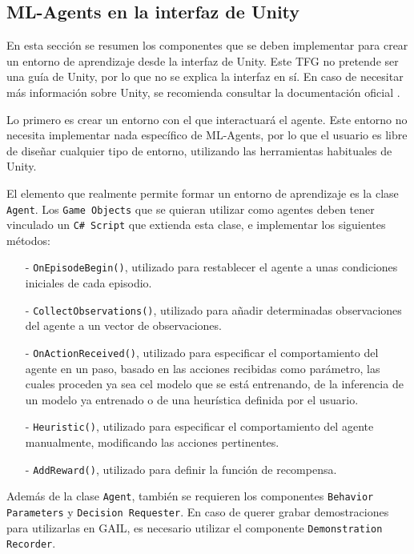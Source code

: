 \newpage

\subsection{ML-Agents en la interfaz de Unity}

En esta sección se resumen los componentes que se deben implementar para crear un entorno de aprendizaje desde la interfaz de Unity. Este TFG no pretende ser una guía de Unity, por lo que no se explica la interfaz en sí. En caso de necesitar más información sobre Unity, se recomienda consultar la documentación oficial \cite{unity-docs}.

Lo primero es crear un entorno con el que interactuará el agente. Este entorno no necesita implementar nada específico de ML-Agents, por lo que el usuario es libre de diseñar cualquier tipo de entorno, utilizando las herramientas habituales de Unity.

El elemento que realmente permite formar un entorno de aprendizaje es la clase \texttt{Agent}. Los \texttt{Game Objects} que se quieran utilizar como agentes deben tener vinculado un \texttt{C\# Script} que extienda esta clase, e implementar los siguientes métodos:
\begin{enumerate}
    \item[-] \texttt{OnEpisodeBegin()}, utilizado para restablecer el agente a unas condiciones iniciales de cada episodio.
    \item[-] \texttt{CollectObservations()}, utilizado para añadir determinadas observaciones del agente a un vector de observaciones.
    \item[-] \texttt{OnActionReceived()}, utilizado para especificar el comportamiento del agente en un paso, basado en las acciones recibidas como parámetro, las cuales proceden ya sea cel modelo que se está entrenando, de la inferencia de un modelo ya entrenado o de una heurística definida por el usuario.
    \item[-] \texttt{Heuristic()}, utilizado para especificar el comportamiento del agente manualmente, modificando las acciones pertinentes.
    \item[-] \texttt{AddReward()}, utilizado para definir la función de recompensa.
\end{enumerate}

Además de la clase \texttt{Agent}, también se requieren los componentes \texttt{Behavior} \texttt{Parameters} y \texttt{Decision Requester}. En caso de querer grabar demostraciones para utilizarlas en GAIL, es necesario utilizar el componente \texttt{Demonstration Recorder}.

